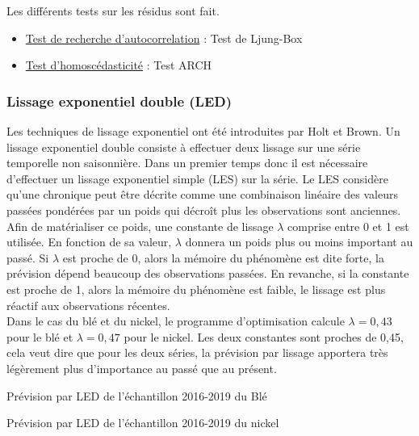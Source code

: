 Les différents tests sur les résidus sont fait.
\begin{itemize}
    \item \underline{Test de recherche d'autocorrelation} : Test de Ljung-Box
    \item \underline{Test d'homoscédasticité} : Test ARCH
\end{itemize}

\subsubsection*{Lissage exponentiel double (LED)}
Les techniques de lissage exponentiel ont été introduites par Holt et Brown. Un lissage exponentiel double consiste à effectuer deux lissage sur une série temporelle 
non saisonnière. Dans un premier temps donc il est nécessaire d'effectuer un lissage exponentiel simple (LES) sur la série. Le LES considère qu'une chronique peut être
décrite comme une combinaison linéaire des valeurs passées pondérées par un poids qui décroît plus les observations sont anciennes. \\[11pt]
Afin de matérialiser ce poids, une  constante de lissage $\lambda$ comprise entre 0 et 1 est utilisée. En fonction de sa valeur, $\lambda$ donnera un poids plus ou moins 
important au passé. Si $ \lambda $ est proche de 0, alors la mémoire du phénomène est dite forte, la prévision dépend beaucoup des observations passées. En revanche, si la 
constante est proche de 1, alors la mémoire du phénomène est faible, le lissage est plus réactif aux observations récentes.\\[11pt]
Dans le cas du blé et du nickel, le programme d'optimisation calcule $ \lambda = 0,43 $ pour le blé et $ \lambda = 0,47 $ pour le nickel. Les deux constantes sont
proches de 0,45, cela veut dire que pour les deux séries, la prévision par lissage apportera très légèrement plus d'importance au passé que au présent.
\begin{table}[H]
    \centering
    \centering
    \caption{Prévision par LED de l'échantillon 2016-2019 du Blé}
    \sffamily
    
\end{table}

\begin{table}[H]
    \centering
    \caption{Prévision par LED de l'échantillon 2016-2019 du nickel}
    \sffamily
    
\end{table}


